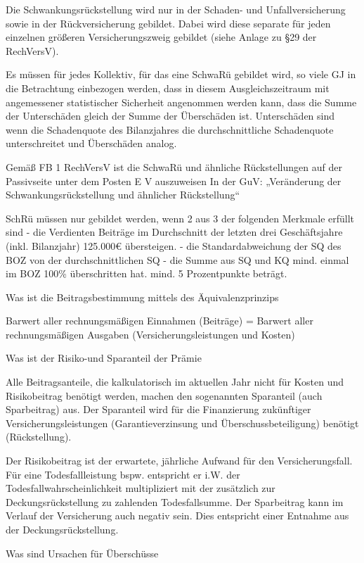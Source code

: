 Die Schwankungsrückstellung wird nur in der Schaden- und Unfallversicherung sowie in der Rückversicherung gebildet. Dabei wird diese
separate für jeden einzelnen größeren Versicherungszweig gebildet (siehe Anlage zu §29 der RechVersV).

Es müssen für jedes Kollektiv, für das eine SchwaRü gebildet wird, so viele GJ in die Betrachtung einbezogen werden, dass in diesem
Ausgleichszeitraum mit angemessener statistischer Sicherheit angenommen werden kann, dass die Summe der Unterschäden gleich der Summe
der Überschäden ist.
Unterschäden sind wenn die Schadenquote des Bilanzjahres die durchschnittliche Schadenquote unterschreitet und Überschäden analog.

Gemäß FB 1 RechVersV ist die SchwaRü und ähnliche Rückstellungen auf der Passivseite unter dem Posten E V auszuweisen
In der GuV: „Veränderung der Schwankungsrückstellung und ähnlicher Rückstellung“

SchRü müssen nur gebildet werden, wenn 2 aus 3 der folgenden Merkmale erfüllt sind
- die Verdienten Beiträge im Durchschnitt der letzten drei Geschäftsjahre (inkl. Bilanzjahr)
  125.000€ übersteigen.
- die Standardabweichung der SQ des
  BOZ von der durchschnittlichen SQ
- die Summe aus SQ und KQ mind. einmal im BOZ 100\% überschritten hat. mind. 5 Prozentpunkte beträgt.


Was ist die Beitragsbestimmung mittels des Äquivalenzprinzips

Barwert aller rechnungsmäßigen Einnahmen (Beiträge) = Barwert aller rechnungsmäßigen Ausgaben (Versicherungsleistungen und Kosten)


Was ist der Risiko-und Sparanteil der Prämie

Alle Beitragsanteile, die kalkulatorisch im aktuellen Jahr nicht für Kosten und Risikobeitrag benötigt werden, machen den sogenannten Sparanteil
(auch Sparbeitrag) aus. Der Sparanteil wird für die Finanzierung zukünftiger Versicherungsleistungen (Garantieverzinsung und
Überschussbeteiligung) benötigt (Rückstellung).

Der Risikobeitrag ist der erwartete, jährliche Aufwand für den Versicherungsfall. Für eine Todesfallleistung bspw. entspricht er i.W. der
Todesfallwahrscheinlichkeit multipliziert mit der zusätzlich zur Deckungsrückstellung zu zahlenden Todesfallsumme.
Der Sparbeitrag kann im Verlauf der Versicherung auch negativ sein. Dies entspricht einer Entnahme aus der Deckungsrückstellung.

Was sind Ursachen für Überschüsse

